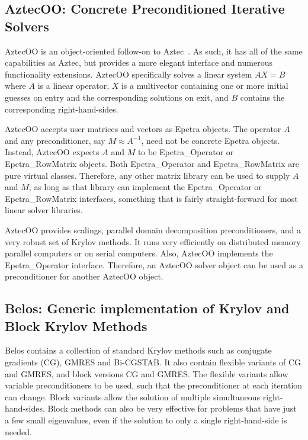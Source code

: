 \documentclass[acmtoms,acmnow]{acmtrans2m}
\begin{document}
\subsection{AztecOO: Concrete Preconditioned Iterative Solvers}

AztecOO is an object-oriented follow-on to Aztec~\cite{Aztec2.1}.  
As such, it has all of the same capabilities as Aztec, but provides 
a more elegant interface and numerous functionality extensions.  
AztecOO specifically solves a linear system $AX=B$ where $A$ is a 
linear operator, $X$ is a multivector containing one or more initial 
guesses on entry and the corresponding solutions on exit, and $B$ 
contains the corresponding right-hand-sides.

AztecOO accepts user matrices and vectors as Epetra objects.  The 
operator $A$ and any preconditioner, say $M \approx A^{-1}$, need 
not be concrete Epetra objects.  Instead, AztecOO expects $A$ and 
$M$ to be Epetra\_Operator or Epetra\_RowMatrix objects.  Both 
Epetra\_Operator and Epetra\_RowMatrix are pure virtual classes.  
Therefore, any other matrix library can be used to supply $A$ 
and $M$, as long as that library can implement the  Epetra\_Operator 
or Epetra\_RowMatrix interfaces, something that is fairly 
straight-forward for most linear solver libraries.

AztecOO provides scalings, parallel domain decomposition 
preconditioners, and a very robust set of Krylov methods.  It runs 
very efficiently on distributed memory parallel computers or on 
serial computers.  Also, AztecOO implements the Epetra\_Operator 
interface.  Therefore, an AztecOO solver object can be used as a 
preconditioner for another AztecOO object.

\subsection{Belos: Generic implementation of Krylov and Block Krylov
Methods}

Belos contains a collection of standard Krylov methods such as
conjugate gradients (CG), GMRES and Bi-CGSTAB.  It also contain flexible
variants of CG and GMRES, and block versions CG and GMRES.  The
flexible variants allow variable preconditioners to be used, such that
the preconditioner at each iteration can change.  Block variants allow
the solution of multiple simultaneous right-hand-sides.  Block methods
can also be very effective for problems that have just a few small
eigenvalues, even if the solution to only a single right-hand-side is
needed.
\end{document}

